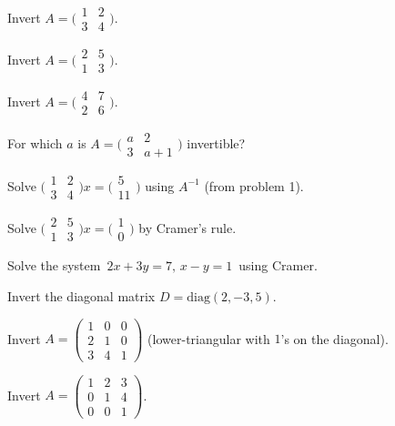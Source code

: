 \begin{problems}
    \item Invert $A = \bigl(\begin{smallmatrix} 1 & 2 \\ 3 & 4 \end{smallmatrix}\bigr)$.
    \item Invert $A = \bigl(\begin{smallmatrix} 2 & 5 \\ 1 & 3 \end{smallmatrix}\bigr)$.
    \item Invert $A = \bigl(\begin{smallmatrix} 4 & 7 \\ 2 & 6 \end{smallmatrix}\bigr)$.
    \item For which $a$ is $A = \bigl(\begin{smallmatrix} a & 2 \\ 3 & a + 1 \end{smallmatrix}\bigr)$ invertible?
    \item Solve $\bigl(\begin{smallmatrix} 1 & 2 \\ 3 & 4 \end{smallmatrix}\bigr) x = \bigl(\begin{smallmatrix} 5 \\ 11 \end{smallmatrix}\bigr)$ using $A^{-1}$ (from problem 1).
    \item Solve $\bigl(\begin{smallmatrix} 2 & 5 \\ 1 & 3 \end{smallmatrix}\bigr) x = \bigl(\begin{smallmatrix} 1 \\ 0 \end{smallmatrix}\bigr)$ by Cramer's rule.
    \item Solve the system $\,2 x + 3 y = 7,\, x - y = 1\,$ using Cramer.
    \item Invert the diagonal matrix $D = \mathrm{diag}(2, -3, 5)$.
    \item Invert $A = \begin{pmatrix} 1 & 0 & 0 \\ 2 & 1 & 0 \\ 3 & 4 & 1 \end{pmatrix}$ (lower-triangular with $1$'s on the diagonal).
    \item Invert $A = \begin{pmatrix} 1 & 2 & 3 \\ 0 & 1 & 4 \\ 0 & 0 & 1 \end{pmatrix}$.

\end{problems}
